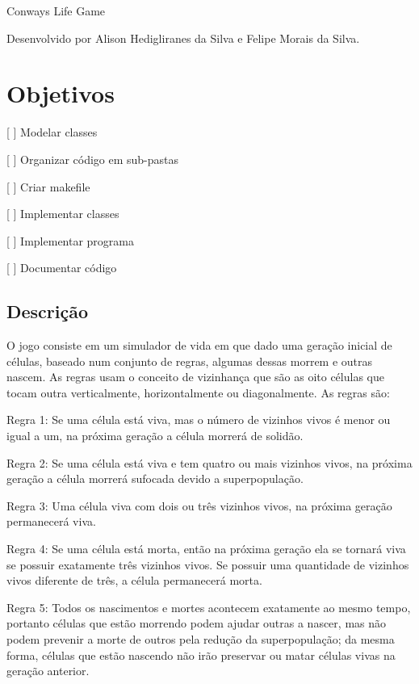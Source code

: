 Conway\textquotesingle{}s Life Game

Desenvolvido por Alison Hedigliranes da Silva e Felipe Morais da Silva.

\section*{Objetivos}


\begin{DoxyItemize}
\item \mbox{[} \mbox{]} Modelar classes
\item \mbox{[} \mbox{]} Organizar código em sub-\/pastas
\item \mbox{[} \mbox{]} Criar makefile
\item \mbox{[} \mbox{]} Implementar classes
\item \mbox{[} \mbox{]} Implementar programa
\item \mbox{[} \mbox{]} Documentar código
\end{DoxyItemize}

\subsection*{Descrição}

O jogo consiste em um simulador de vida em que dado uma geração inicial de células, baseado num conjunto de regras, algumas dessas morrem e outras nascem. As regras usam o conceito de vizinhança que são as oito células que tocam outra verticalmente, horizontalmente ou diagonalmente. As regras são\+:
\begin{DoxyItemize}
\item Regra 1\+: Se uma célula está viva, mas o número de vizinhos vivos é menor ou igual a um, na próxima geração a célula morrerá de solidão.
\item Regra 2\+: Se uma célula está viva e tem quatro ou mais vizinhos vivos, na próxima geração a célula morrerá sufocada devido a superpopulação.
\item Regra 3\+: Uma célula viva com dois ou três vizinhos vivos, na próxima geração permanecerá viva.
\item Regra 4\+: Se uma célula está morta, então na próxima geração ela se tornará viva se possuir exatamente três vizinhos vivos. Se possuir uma quantidade de vizinhos vivos diferente de três, a célula permanecerá morta.
\item Regra 5\+: Todos os nascimentos e mortes acontecem exatamente ao mesmo tempo, portanto células que estão morrendo podem ajudar outras a nascer, mas não podem prevenir a morte de outros pela redução da superpopulação; da mesma forma, células que estão nascendo não irão preservar ou matar células vivas na geração anterior.
\end{DoxyItemize}

